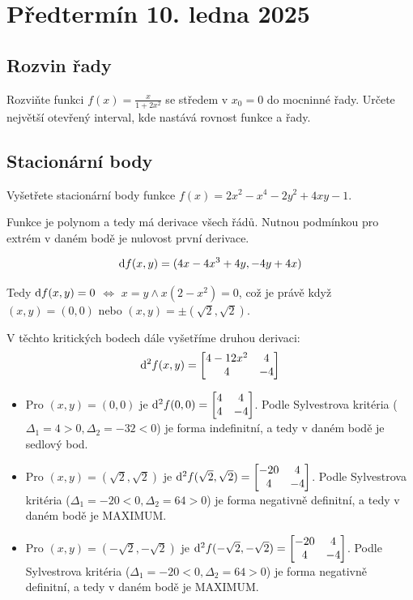 \section{Předtermín 10. ledna 2025}

\subsection{Rozvin řady}
Rozviňte funkci $f(x) = \frac{x}{1+2x^2}$ se středem v $x_0 = 0$ do mocninné řady. Určete největší otevřený interval, kde 
nastává rovnost funkce a řady.

\subsection{Stacionární body}
Vyšetřete stacionární body funkce $f(x) = 2x^2 - x^4 - 2y^2 + 4xy - 1$.

Funkce je polynom a tedy má derivace všech řádů. Nutnou podmínkou pro extrém v daném bodě je nulovost první derivace.

$$\mathop{}\!\mathrm{d} f(x, y) = (4x - 4x^3 + 4y, -4y + 4x)$$

Tedy $\mathop{}\!\mathrm{d} f(x, y) = 0$ $\iff$ $x=y \land x(2-x^2) = 0$, což je právě když $(x,y)=(0,0)$ nebo $(x,y)=\pm(\sqrt{2},\sqrt{2})$.

V těchto kritických bodech dále vyšetříme druhou derivaci:
$$\mathop{}\!\mathrm{d}^2 f(x,y)=
    \begin{bmatrix}
        4-12x^2 & 4\\
        4 & -4
    \end{bmatrix}
$$

\begin{itemize}
    \item Pro $(x,y) = (0,0)$ je $\mathop{}\!\mathrm{d}^2f(0,0) = 
        \begin{bmatrix}
            4 & 4\\
            4 & -4
        \end{bmatrix}
        $. Podle Sylvestrova kritéria ($\Delta_1 = 4>0, \Delta_2 = -32 < 0$) je forma indefinitní, a tedy v daném bodě 
        je sedlový bod.
    \item Pro $(x,y) = (\sqrt{2}, \sqrt{2})$ je $\mathop{}\!\mathrm{d}^2f(\sqrt{2}, \sqrt{2}) = 
    \begin{bmatrix}
        -20 & 4\\
        4 & -4
    \end{bmatrix}
    $. Podle Sylvestrova kritéria ($\Delta_1 = -20<0, \Delta_2 = 64 > 0$) je forma negativně definitní, a tedy v daném bodě 
    je MAXIMUM.
    \item Pro $(x,y) = (-\sqrt{2}, -\sqrt{2})$ je $\mathop{}\!\mathrm{d}^2f(-\sqrt{2}, -\sqrt{2}) = 
    \begin{bmatrix}
        -20 & 4\\
        4 & -4
    \end{bmatrix}
    $. Podle Sylvestrova kritéria ($\Delta_1 = -20<0, \Delta_2 = 64 > 0$) je forma negativně definitní, a tedy v daném bodě 
    je MAXIMUM.
\end{itemize}

